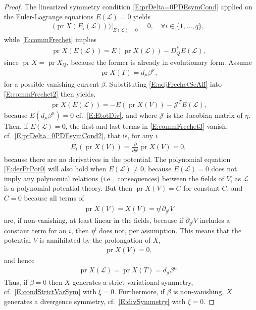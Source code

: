 \documentclass[10pt,a4paper]{amsart}
\newcommand{\mc}{\mathcal}
\newcommand{\on}{\operatorname}
\begin{document}
\begin{proof}
 The linearized symmetry condition \eqref{E:prDelta=0PDEsymCond}
applied on the Euler-Lagrange equations $E(\mc{L})=0$ yields
\begin{align}\label{E:prDelta=0PDEsymCond2}
	 \big(\on{pr}X(E_i(\mc{L}))\big)|_{E(\mc{L}) = 0}=0, \quad \forall i\in \{1,\ldots,q\},  
\end{align}
while \eqref{E:commFrechet} implies
\begin{align}\label{E:commFrechet2}
	\on{pr}X(E(\mc{L}))= E(\on{pr}X(\mc{L}))-D_Q^\ast E(\mc{L}),
\end{align}
since $\on{pr}X= \on{pr}X_Q$, because the former is already in evolutionary form. Assume 
\begin{align}
\on{pr}X(T)=d_\mu \beta^\mu, 	
\end{align}
for a possible vanishing current $\beta$. Substituting \eqref{E:adjFrechetScAff} into \eqref{E:commFrechet2} then yields, 
\begin{align}\label{E:commFrechet3}
	\on{pr}X(E(\mc{L}))= -E(\on{pr}X(V))-\mc{J}^T E(\mc{L}),
\end{align}
because $E(d_\mu \beta^\mu)=0$ cf.~\eqref{E:EtotDiv}, and
where $\mc{J}$ is the Jacobian matrix of $\eta$.
Then, if $E(\mc{L}) = 0$, the first and last terms in \eqref{E:commFrechet3} vanish, cf.~\eqref{E:prDelta=0PDEsymCond2}, that is, for any $i$
\begin{align}\label{E:derPrPot0}
	E_i(\on{pr}X(V))=\frac{\partial}{\partial y^i}\on{pr}X(V)=0,
\end{align}
because there are no derivatives in the potential. The polynomial equation \eqref{E:derPrPot0} will also hold when $E(\mc{L})\ne 0$, because $E(\mc{L})= 0$ does not imply any polynomial relations (i.e.,~consequences) between the fields of $V$, as $\mc{L}$ is a polynomial potential theory. But then $\on{pr}X(V)=C$ for constant $C$, and $C=0$ because all terms of 
\begin{align}
\on{pr}X(V)=X(V)=\eta^i\partial_{y^i}V	
\end{align}
are, if non-vanishing, at least linear in the fields, because if $\partial_{y^i}V$ includes a constant term for an $i$, then $\eta^i$ does not, per assumption. This means that the potential $V$ is annihilated by 
the prolongation of $X$,
\begin{align}
	\on{pr}X(V)=0, 
\end{align}
  and hence 
	\begin{align}
		\on{pr}X(\mc{L})=\on{pr}X(T)=d_\mu \beta^\mu.
	\end{align}
Thus, if 
 $\beta=0$ then $X$ generates a strict variational symmetry, cf.~\eqref{E:condStrictVarSym} with $\xi=0$.
Furthermore, if $\beta$ is non-vanishing, $X$ generates a divergence symmetry, cf.~\eqref{E:divSymmetry} with $\xi=0$.
\end{proof}
\end{document}
